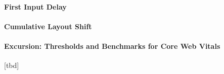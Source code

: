 



 





\paragraph{First Input Delay}










\paragraph{Cumulative Layout Shift}











\paragraph{Excursion: Thresholds and Benchmarks for Core Web Vitals}


[tbd]




